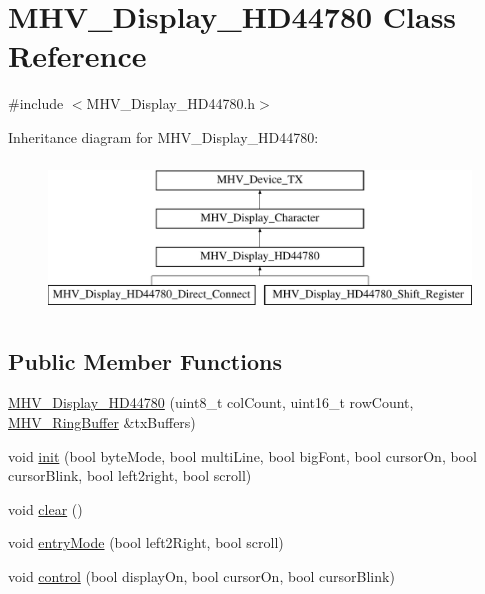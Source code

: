 \hypertarget{class_m_h_v___display___h_d44780}{
\section{\-M\-H\-V\-\_\-\-Display\-\_\-\-H\-D44780 \-Class \-Reference}
\label{class_m_h_v___display___h_d44780}
}


{\ttfamily \#include $<$\-M\-H\-V\-\_\-\-Display\-\_\-\-H\-D44780.\-h$>$}

\-Inheritance diagram for \-M\-H\-V\-\_\-\-Display\-\_\-\-H\-D44780\-:\begin{figure}[H]
\begin{center}
\leavevmode
\includegraphics[height=4.000000cm]{class_m_h_v___display___h_d44780}
\end{center}
\end{figure}
\subsection*{\-Public \-Member \-Functions}
\begin{DoxyCompactItemize}
\item 
\hyperlink{class_m_h_v___display___h_d44780_acebfcd07765a130db77ffb35bc173896}{\-M\-H\-V\-\_\-\-Display\-\_\-\-H\-D44780} (uint8\-\_\-t col\-Count, uint16\-\_\-t row\-Count, \hyperlink{class_m_h_v___ring_buffer}{\-M\-H\-V\-\_\-\-Ring\-Buffer} \&tx\-Buffers)
\item 
void \hyperlink{class_m_h_v___display___h_d44780_a4e0ed118d834b0c0ac68ac03d28f4246}{init} (bool byte\-Mode, bool multi\-Line, bool big\-Font, bool cursor\-On, bool cursor\-Blink, bool left2right, bool scroll)
\item 
void \hyperlink{class_m_h_v___display___h_d44780_a1dd0adb212ad9485352ee3a59e7e4e7b}{clear} ()
\item 
void \hyperlink{class_m_h_v___display___h_d44780_a428016d2114187bbe3030e8c08861897}{entry\-Mode} (bool left2\-Right, bool scroll)
\item 
void \hyperlink{class_m_h_v___display___h_d44780_ada0c9ee4be9958c59e02bc55e4033511}{control} (bool display\-On, bool cursor\-On, bool cursor\-Blink)
\end{DoxyCompactItemize}
